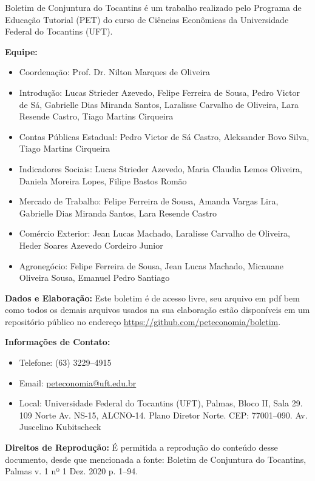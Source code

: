 \begin{tcolorbox}[colback=boxbackground, colframe=boxbackground, arc=0mm, top=15pt]
Boletim de Conjuntura do Tocantins é um trabalho realizado pelo Programa de Educação Tutorial (PET) do curso de Ciências Econômicas da Universidade Federal do Tocantins (UFT).
\\
\par{\bf Equipe:}
\begin{itemize}
	\item{Coordenação:} Prof. Dr. Nilton Marques de Oliveira
	\item{Introdução:} Lucas Strieder Azevedo, Felipe Ferreira de Sousa, Pedro Victor de Sá, Gabrielle Dias Miranda Santos, Laralisse Carvalho de Oliveira, Lara Resende Castro, Tiago Martins Cirqueira
	\item{Contas Públicas Estadual:} Pedro Victor de Sá Castro, Aleksander Bovo Silva, Tiago Martins Cirqueira
	\item{Indicadores Sociais:} Lucas Strieder Azevedo, Maria Claudia Lemos Oliveira, Daniela Moreira Lopes, Filipe Bastos Romão
	\item{Mercado de Trabalho:} Felipe Ferreira de Sousa, Amanda Vargas Lira, Gabrielle Dias Miranda Santos, Lara Resende Castro
	\item{Comércio Exterior:} Jean Lucas Machado,  Laralisse Carvalho de Oliveira, Heder Soares Azevedo Cordeiro Junior
	\item{Agronegócio:} Felipe Ferreira de Sousa, Jean Lucas Machado, Micauane Oliveira Sousa, Emanuel Pedro Santiago
\end{itemize}
\par{\bf Dados e Elaboração:}
Este boletim é de acesso livre, seu arquivo em pdf bem como todos os demais arquivos usados na sua elaboração estão disponíveis em um repositório público no endereço \url{https://github.com/peteconomia/boletim}.
\\
\par{\bf Informações de Contato:}
\begin{itemize}
	\item{Telefone:} (63) 3229--4915
	\item{Email:} \url{peteconomia@uft.edu.br}
	\item{Local:} Universidade Federal do Tocantins (UFT), Palmas, Bloco II, Sala 29. 109 Norte Av. NS-15, ALCNO-14. Plano Diretor Norte. CEP: 77001--090. Av. Juscelino Kubitscheck
\end{itemize}
\par{\bf Direitos de Reprodução:}
É permitida a reprodução do conteúdo desse documento, desde que mencionada a fonte: Boletim de Conjuntura do Tocantins, Palmas v. 1 nº 1 Dez. 2020 p. 1--94.
\end{tcolorbox}